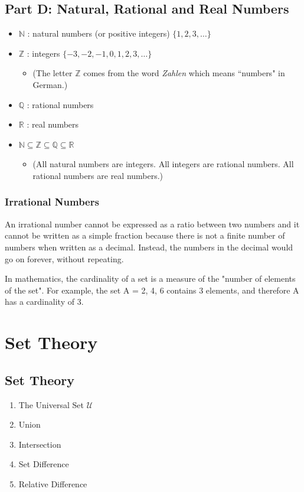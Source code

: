 \documentclass[]{report}
\begin{document}
\section*{Part D: Natural, Rational and Real Numbers}
\begin{itemize}
\item $\mathbb{N}$ : natural numbers (or positive integers) $\{1,2,3,\ldots\}$
\item $\mathbb{Z}$ : integers $\{-3,-2,-1,0,1,2,3,\ldots\}$
\begin{itemize}
\item (The letter $\mathbb{Z}$ comes from the word \emph{Zahlen} which means ``numbers" in German.)
\end{itemize}
\item $\mathbb{Q}$ : rational numbers
\item $\mathbb{R}$ : real numbers
\item $\mathbb{N} \subseteq \mathbb{Z } \subseteq \mathbb{Q} \subseteq \mathbb{R}$
\begin{itemize}
\item (All natural numbers are integers. All integers are rational numbers. All rational numbers are real numbers.)
\end{itemize}
\end{itemize}




\subsection{Irrational Numbers}
An irrational number cannot be expressed as a ratio between two numbers and it cannot be written as a simple fraction because there is not a finite number of numbers when written as a decimal. Instead, the numbers in the decimal would go on forever, without repeating.



In mathematics, the cardinality of a set is a measure of the "number of elements of the set". For example, the set A = {2, 4, 6} contains 3 elements, and therefore A has a cardinality of 3.





\chapter{Set Theory}



\section{Set Theory}
\begin{enumerate}
\item The Universal Set $\mathcal{U}$
\item Union
\item Intersection
\item Set Difference
\item Relative Difference
\end{enumerate}
\end{document}
